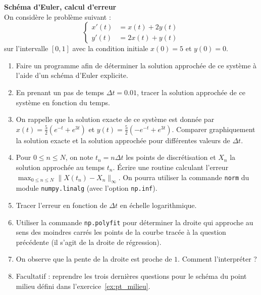 \documentclass[12pt]{article}
\begin{document}
\begin{exo} \textbf{Sch\'ema d'Euler, calcul d'erreur} \\
On consid\`ere le probl\`eme suivant :
$$
\left\{
\begin{array}{rl}
x'(t)&=x(t)+2y(t)\\
y'(t)&=2x(t)+y(t)
\end{array}
\right.
$$
sur l'intervalle $[0,1]$ avec la condition initiale $x(0)=5$ et $y(0)=0$.
\begin{enumerate}
\item Faire un programme afin de d\'eterminer la solution approch\'ee de ce syst\`eme \`a l'aide d'un sch\'ema d'Euler explicite. 
\item En prenant un pas de temps $\Delta t = 0.01$, tracer la solution approch\'ee de ce syst\`eme en fonction du temps.
\item On rappelle que la solution exacte de ce syst\`eme est donn\'ee par
  $x(t) = \frac52 (e^{-t} + e^{3t})$ et $y(t) = \frac52 (-e^{-t} + e^{3t})$. Comparer graphiquement la solution exacte et la solution approch\'ee pour diff\'erentes valeurs de $\Delta t$.
\item Pour $0\leq n \leq N$, on note $t_n=n\Delta t$ les points de discr\'etisation et $X_n$ la solution approch\'ee au temps $t_n$. \'Ecrire une routine calculant l'erreur $\max_{0\leq n \leq N}\|X(t_n)-X_n\|_{\infty}$. On pourra utiliser la commande \texttt{norm} du module \texttt{numpy.linalg} (avec l'option \texttt{np.inf}). 
\item Tracer  l'erreur en fonction de $\Delta t$ en \'echelle logarithmique. 
\item Utiliser la commande \texttt{np.polyfit} pour d\'eterminer la droite qui approche au sens des moindres carr\'es les points de la courbe tracée à la question précédente  (il s'agit de la droite de r\'egression). 
\item On observe que la pente de la droite est proche de $1$. Comment l'interpr\'eter ?
\item Facultatif : reprendre les trois derni\`eres questions
  pour le sch\'ema du point milieu d\'efini dans l'exercice~\ref{ex:pt_milieu}.
\end{enumerate}
\end{exo}
\newpage
\end{document}
